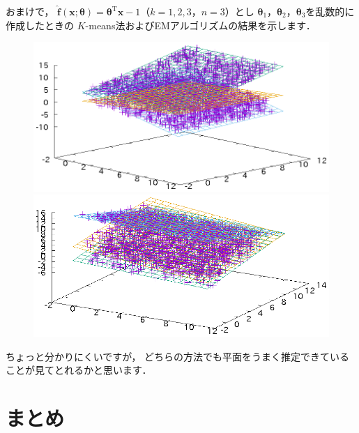 ﻿\documentclass{jsarticle}
\begin{document}
おまけで，
$\hat{\bm{f}}(\bm{x};\bm{\theta})=\bm{\theta}^{\mathrm{T}}\bm{x}-1$（$k=1,2,3$，$n=3$）とし
$\bm{\theta}_{1}$，$\bm{\theta}_{2}$，$\bm{\theta}_{3}$を乱数的に作成したときの
$K$-means法およびEMアルゴリズムの結果を示します．
\begin{figure}[h]
\begin{center}
 \begin{minipage}{.4\textwidth}
 \begin{center}
 \includegraphics[height=.2\textheight]{fig/k_plane.eps}
 \end{center}
 \end{minipage}
 \begin{minipage}{.4\textwidth}
 \begin{center}
 \includegraphics[height=.2\textheight]{fig/g_plane.eps}
 \end{center}
 \end{minipage}
\end{center}
\end{figure}
ちょっと分かりにくいですが，
どちらの方法でも平面をうまく推定できていることが見てとれるかと思います．

\section{まとめ}
\end{document}
